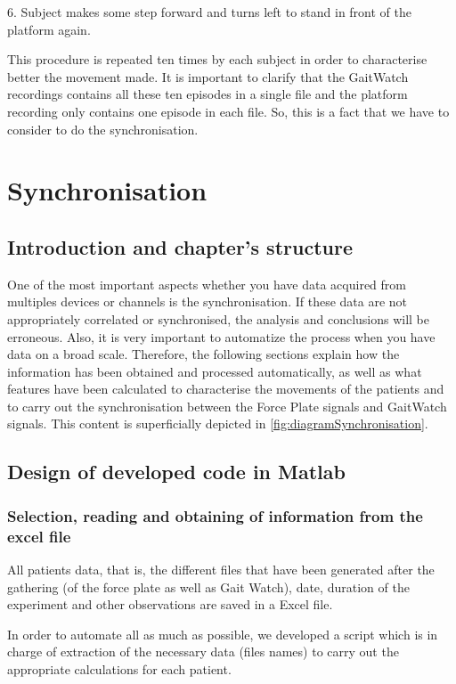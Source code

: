6.	Subject makes some step  forward and turns left to stand in front of the platform again.

This procedure is repeated ten times by each subject in order to characterise better the movement made.
It is important to clarify that the GaitWatch recordings contains all these ten episodes in a single file and the platform recording only contains one episode in each file. So, this is a fact that we have to consider to do the synchronisation.

\section{Synchronisation}

\subsection{Introduction and chapter's structure}
One of the most important aspects whether you have data acquired from multiples devices or channels is the synchronisation. If these data are not appropriately correlated or synchronised, the analysis and conclusions will be erroneous. Also, it is very important to automatize the process when you have data on a broad scale.
Therefore, the following sections explain how the information has been obtained and processed automatically, as well as what features have been calculated to characterise the movements of the patients and to carry out the synchronisation between the Force Plate signals and GaitWatch signals. This content is superficially depicted in \ref{fig:diagramSynchronisation}.

\subsection{Design of developed code  in Matlab}
\subsubsection{Selection, reading and obtaining of information from the excel file}
All patients data, that is, the different files that have been generated after the gathering  (of the force plate as well as Gait Watch), date, duration of the experiment and other observations are saved in a Excel file. 

In order to automate all as much as possible, we developed a script which is in charge of extraction of the necessary data (files names) to carry out the appropriate calculations for each patient. 

